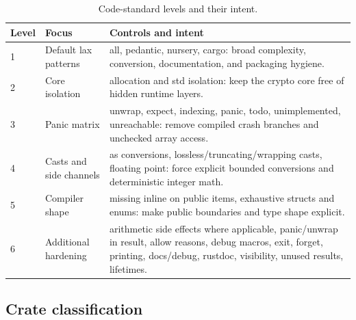 \documentclass[11pt,a4paper]{article}
\theoremstyle{remark}
\begin{document}
\begin{table}[ht]
\centering
\caption{Code-standard levels and their intent.}
\label{tab:lintlevels}
\small
\begin{tabularx}{\textwidth}{@{}p{1.0cm}p{3.0cm}Y@{}}
\toprule
Level & Focus & Controls and intent\\
 & Default lax patterns & all, pedantic, nursery, cargo: broad complexity, conversion, documentation, and packaging hygiene.\\
2 & Core isolation & allocation and std isolation: keep the crypto core free of hidden runtime layers.\\
3 & Panic matrix & unwrap, expect, indexing, panic, todo, unimplemented, unreachable: remove compiled crash branches and unchecked array access.\\
4 & Casts and side channels & as conversions, lossless/truncating/wrapping casts, floating point: force explicit bounded conversions and deterministic integer math.\\
5 & Compiler shape & missing inline on public items, exhaustive structs and enums: make public boundaries and type shape explicit.\\
6 & Additional hardening & arithmetic side effects where applicable, panic/unwrap in result, allow reasons, debug macros, exit, forget, printing, docs/debug, rustdoc, visibility, unused results, lifetimes.\\
\bottomrule
\end{tabularx}
\end{table}

\subsection{Crate classification}
\end{document}
